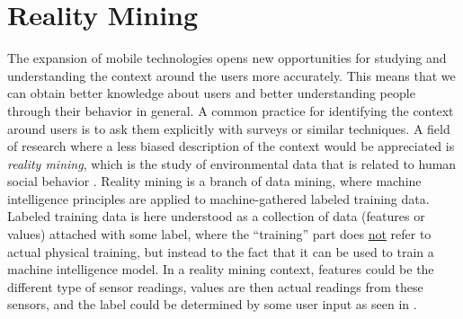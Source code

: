 
\section{Reality Mining}
\label{sec:reality_mining}
The expansion of mobile technologies opens new opportunities for studying and understanding the context around the users more accurately. This means that we can obtain better knowledge about users and better understanding people through their behavior in general. A common practice for identifying the context around users is to ask them explicitly with surveys or similar techniques. A field of research where a less biased description of the context would be appreciated is \emph{reality mining}, which is the study of environmental data that is related to human social behavior \parencite{madan2009_reality_mining_privacy}. Reality mining is a branch of data mining, where machine intelligence principles are applied to machine-gathered labeled training data. Labeled training data is here understood as a collection of data (features or values) attached with some label, where the ``training'' part does \underline{not} refer to actual physical training, but instead to the fact that it can be used to train a machine intelligence model. In a reality mining context, features could be the different type of sensor readings, values are then actual readings from these sensors, and the label could be determined by some user input as seen in .
\\
